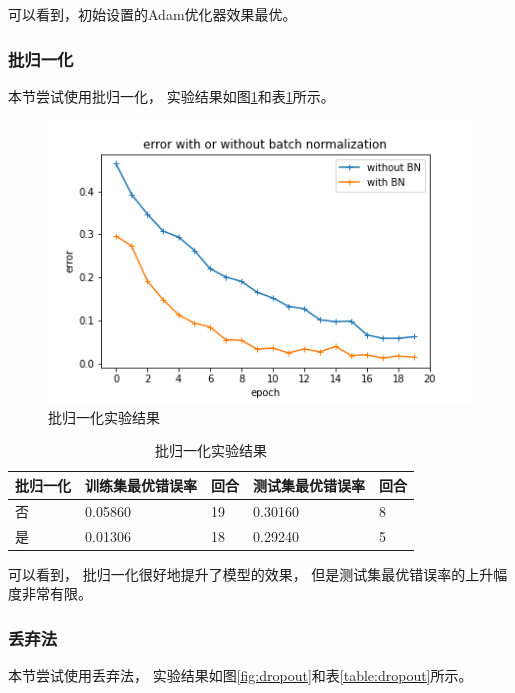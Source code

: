 \documentclass{article}
\begin{document}
可以看到，初始设置的Adam优化器效果最优。

\subsubsection{批归一化}

本节尝试使用批归一化，
实验结果如图\ref{fig:BN}和表\ref{table:BN}所示。

\begin{figure}[p]
\includegraphics[width=\textwidth]
{Result/NN BN 0.001/figure.png}
\caption{批归一化实验结果}
\label{fig:BN}
\end{figure}

\begin{table}[h]
\centering
\begin{tabular}{|l|l|l|l|l|} 
\hline
批归一化 & 训练集最优错误率 & 回合 & 测试集最优错误率 & 回合 \\
\hline
否 & 0.05860 & 19 & 0.30160 & 8 \\
是 & 0.01306 & 18 & 0.29240 & 5 \\
\hline
\end{tabular}
\caption{批归一化实验结果}
\label{table:BN}
\end{table}

可以看到，
批归一化很好地提升了模型的效果，
但是测试集最优错误率的上升幅度非常有限。

\subsubsection{丢弃法}

本节尝试使用丢弃法，
实验结果如图\ref{fig:dropout}和表\ref{table:dropout}所示。
\end{document}
